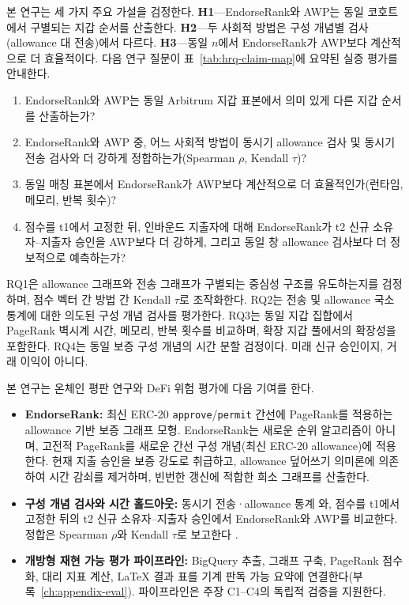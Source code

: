 
본 연구는 세 가지 주요 가설을 검정한다. \textbf{H1}---EndorseRank와 AWP는 동일 코호트에서 구별되는 지갑 순서를 산출한다. \textbf{H2}---두 사회적 방법은 구성 개념별 검사(allowance 대 전송)에서 다르다. \textbf{H3}---동일 $n$에서 EndorseRank가 AWP보다 계산적으로 더 효율적이다. 다음 연구 질문이 표~\ref{tab:hrq-claim-map}에 요약된 실증 평가를 안내한다.

\begin{enumerate}
\item[\textbf{RQ1.}] EndorseRank와 AWP는 동일 Arbitrum 지갑 표본에서 의미 있게 다른 지갑 순서를 산출하는가?
\item[\textbf{RQ2.}] EndorseRank와 AWP 중, 어느 사회적 방법이 동시기 allowance 검사 및 동시기 전송 검사와 더 강하게 정합하는가(Spearman $\rho$, Kendall $\tau$)?
\item[\textbf{RQ3.}] 동일 매칭 표본에서 EndorseRank가 AWP보다 계산적으로 더 효율적인가(런타임, 메모리, 반복 횟수)?
\item[\textbf{RQ4.}] 점수를 t1에서 고정한 뒤, 인바운드 지출자에 대해 EndorseRank가 t2 신규 소유자--지출자 승인을 AWP보다 더 강하게, 그리고 동일 창 allowance 검사보다 더 정보적으로 예측하는가?
\end{enumerate}

RQ1은 allowance 그래프와 전송 그래프가 구별되는 중심성 구조를 유도하는지를 검정하며, 점수 벡터 간 방법 간 Kendall $\tau$로 조작화한다. RQ2는 전송 및 allowance 국소 통계에 대한 의도된 구성 개념 검사를 평가한다. RQ3는 동일 지갑 집합에서 PageRank 벽시계 시간, 메모리, 반복 횟수를 비교하며, 확장 지갑 풀에서의 확장성을 포함한다. RQ4는 동일 보증 구성 개념의 시간 분할 검정이다. 미래 신규 승인이지, 거래 이익이 아니다.


본 연구는 온체인 평판 연구와 DeFi 위험 평가에 다음 기여를 한다.
\begin{itemize}
\item \textbf{EndorseRank:} 최신 ERC-20 \texttt{approve}/\texttt{permit} 간선에 PageRank를 적용하는 allowance 기반 보증 그래프 모형. EndorseRank는 새로운 순위 알고리즘이 아니며, 고전적 PageRank를 새로운 간선 구성 개념(최신 ERC-20 allowance)에 적용한다. 현재 지출 승인을 보증 강도로 취급하고, allowance 덮어쓰기 의미론에 의존하여 시간 감쇠를 제거하며, 빈번한 갱신에 적합한 희소 그래프를 산출한다.
\item \textbf{구성 개념 검사와 시간 홀드아웃:} 동시기 전송·allowance 통계 와, 점수를 t1에서 고정한 뒤의 t2 신규 소유자--지출자 승인에서 EndorseRank와 AWP를 비교한다. 정합은 Spearman $\rho$와 Kendall $\tau$로 보고한다 .
\item \textbf{개방형 재현 가능 평가 파이프라인:} BigQuery 추출, 그래프 구축, PageRank 점수화, 대리 지표 계산, LaTeX 결과 표를 기계 판독 가능 요약에 연결한다(부록~\ref{ch:appendix-eval}). 파이프라인은 주장 C1--C4의 독립적 검증을 지원한다.
\end{itemize}

